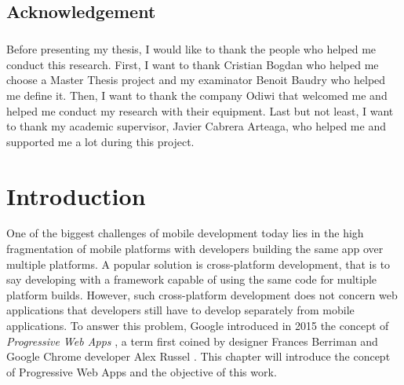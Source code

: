 \documentclass{kththesis}
\begin{document}
\section*{Acknowledgement}
\paragraph{}
Before presenting my thesis, I would like to thank the people who helped me conduct this research. First, I want to thank Cristian Bogdan who helped me choose a Master Thesis project and my examinator Benoit Baudry who helped me define it. 
Then, I want to thank the company Odiwi that welcomed me and helped me conduct my research with their equipment. Last but not least, I want to thank my academic supervisor, Javier Cabrera Arteaga, who helped me and supported me a lot during this project. 

\tableofcontents


\mainmatter


\chapter{Introduction}


\indent 

One of the biggest challenges of mobile development today lies in the high fragmentation of mobile platforms \cite{MobileDevChallenges} with developers building the same app over multiple platforms. A popular solution is cross-platform development, that is to say developing with a framework capable of using the same code for multiple platform builds. However, such cross-platform development does not concern web applications that developers still have to develop separately from mobile applications. To answer this problem, Google introduced in 2015 the concept of \textit{Progressive Web Apps} \cite{PWA_intro}, a term first coined by designer Frances Berriman and Google Chrome developer Alex Russel \cite{PWA_blog} \cite{PWApossibleUnifer}.
This chapter will introduce the concept of Progressive Web Apps and the objective of this work.

\end{document}
